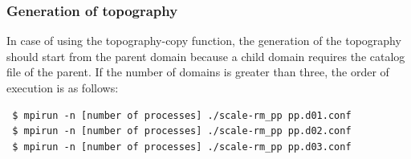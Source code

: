 \subsubsection{Generation of topography}
In case of using the topography-copy function, the generation of the topography should start from the parent domain  because a child domain requires the catalog  file of the parent. If the number of domains is greater than three, the order of execution is as follows: 
\begin{verbatim}
 $ mpirun -n [number of processes] ./scale-rm_pp pp.d01.conf
 $ mpirun -n [number of processes] ./scale-rm_pp pp.d02.conf
 $ mpirun -n [number of processes] ./scale-rm_pp pp.d03.conf
\end{verbatim}


